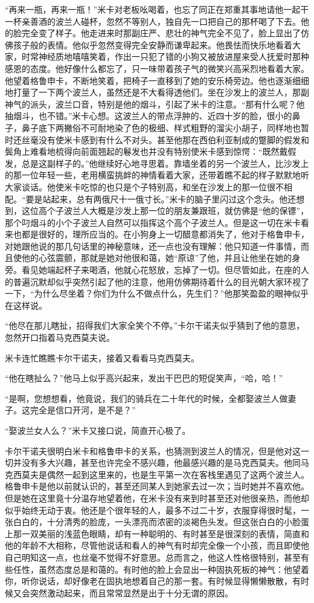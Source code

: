 \par “再来一瓶，再来一瓶！”米卡对老板吆喝着，也忘了同正在郑重其事地请他一起干一杯亲善酒的波兰人碰杯，忽然不等别人，独自先一口把自己的那杯喝了下去。他的脸完全变了样子。他走进来时那副庄严、悲壮的神气完全不见了，脸上显出了仿佛孩子般的表情。他似乎忽然变得完全安静而谦卑起来。他畏怯而快乐地看着大家，时常神经质地嘻嘻笑着，作出一只犯了错的小狗又被放进屋来受人抚爱时那种感恩的态度。他好像什么都忘了，只一味带着孩子气的微笑兴高采烈地看着大家。他望着格鲁申卡，不断地笑着，把椅子一直移到了她的安乐椅旁边。他也逐渐细细地打量了一下两个波兰人，虽然还是不大看得透他们。坐在沙发上的波兰人，那副神气的派头，波兰口音，特别是他的烟斗，引起了米卡的注意。“那有什么呢？他抽烟斗，也不错。”米卡心想。这波兰人的带点浮肿的、近四十岁的脸，很小的鼻子，鼻子底下两撇俗不可耐地染了色的极细、样式粗野的溜尖小胡子，同样地也暂时还丝毫没有使米卡感到有什么不对头。甚至他那在西伯利亚制成的蹩脚的假发和鬓角上难看地梳得向前面翘起的鬈发也并没有特别使米卡感到惊愕：“既然戴假发，总是这副样子的。”他继续好心地寻思着。靠墙坐着的另一个波兰人，比沙发上的那一位年轻一些，老用横蛮挑衅的神情看着大家，还带着瞧不起的样子默默地听大家谈话。他使米卡吃惊的也只是个子特别高，和坐在沙发上的那一位很不相配。“要是站起来，总有两俄尺十一俄寸长。”米卡的脑子里闪过这个念头。他还想到，这位高个子波兰人大概是沙发上那一位的朋友兼跟班，就仿佛是“他的保镖”，那个叼烟斗的小个子波兰人自然可以指挥这个高个子波兰人。但是这一切在米卡看来也都是很好的，理所应当的。在小狗身上一切醋意都消失了，他对于格鲁申卡，对她跟他说的那几句话里的神秘意味，还一点也没有理解：他只知道一件事情，而且使他的心弦震颤，那就是她对他很和蔼，她“原谅”了他，并且让他坐在她的身旁。看见她端起杯子来喝酒，他就心花怒放，忘掉了一切。但尽管如此，在座的人的普遍沉默却似乎突然引起了他的注意，他用仿佛期待着什么的目光朝大家环视了一下，“为什么尽坐着？你们为什么不做点什么，先生们？”他那笑盈盈的眼神似乎在这样说。
\par “他尽在那儿瞎扯，招得我们大家全笑个不停。”卡尔干诺夫似乎猜到了他的意思，忽然开口指着马克西莫夫说。
\par 米卡连忙瞧瞧卡尔干诺夫，接着又看看马克西莫夫。
\par “他在瞎扯么？”他马上似乎高兴起来，发出干巴巴的短促笑声，“哈，哈！”
\par “是啊，您想想看，他竟说，我们的骑兵在二十年代的时候，全都娶波兰人做妻子。这完全是信口开河，是不是？”
\par “娶波兰女人么？”米卡又接口说，简直开心极了。
\par 卡尔干诺夫很明白米卡和格鲁申卡的关系，也猜测到波兰人的情况，但是他对这一切并没有多大兴趣，甚至也许完全不感兴趣，他最感兴趣的是马克西莫夫。他同马克西莫夫是偶然一起到这里来的，也是生平第一次在客栈里遇见了这两个波兰人。格鲁申卡是他以前就认识的，甚至还同某人到她家去过一次；当时她并不喜欢他。但是她在这里竟十分温存地望着他，在米卡没有来到时甚至还对他很亲热，而他却似乎始终无动于衷。他还是个很年轻的人，最多不过二十岁，衣服穿得很时髦，一张白白的，十分清秀的脸庞，一头漂亮而浓密的淡褐色头发。但这张白白的小脸蛋上那一双美丽的浅蓝色眼睛，却有一种聪明的、有时甚至是很深刻的表情，简直和他的年龄不大相称，尽管他说话和看人的神气有时却完全像一个小孩，而且即使他自己明知这一点，也丝毫不觉得不好意思。总而言之，他这人性格很特别，甚至有些任性，虽然态度总是和蔼的。有时他的脸上会显出一种固执死板的神气：他望着你，听你说话，却好像老在固执地想着自己的那一套。有时候显得懒懒散散，有时候又会突然激动起来，而且常常显然是出于十分无谓的原因。
